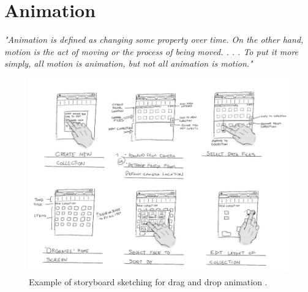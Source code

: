 %
%
% 
% 
% 


\chapter{Animation}

\label{chap:Animation}

{\em"Animation is defined as changing some property over time. On the other hand, motion is the act of moving or the process of being moved. . . .  To put it more simply, all motion is animation, but not all animation is motion."}\citep{head2016designing}

\label{sec:anime_sthg}


\begin{figure}[tp]
\centering
\includegraphics[keepaspectratio,width=\hsize,height=\halfh]
{images/storyboard.jpeg}

\caption[Storyboard Sketching]{
Example of storyboard sketching for drag and drop animation \citep{microsoftStoryboard}.
}
\label{fig:storyboard}
\end{figure}

